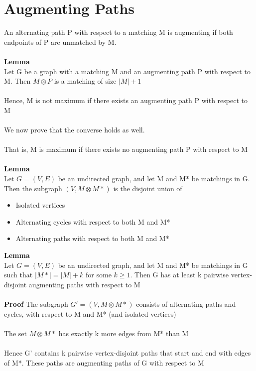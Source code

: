 \documentclass{article}[18pt]
\begin{document}
\section{Augmenting Paths} 
An alternating path P with respect to a matching M is augmenting if both endpoints of P are unmatched by M.\\
\\
\textbf{Lemma}\\
Let G be a graph with a matching M and an augmenting path P with respect to M. Then $M \otimes P$ is a matching of size $|M|+1$\\
\\
Hence, M is not maximum if there exists an augmenting path P with respect to M\\
\\
We now prove that the converse holds as well.\\
\\
That is, M is maximum if there exists no augmenting path P with respect to M\\
\\
\textbf{Lemma}\\
Let $G=(V,E)$ be an undirected graph, and let M and M* be matchings in G. Then the subgraph $(V, M\otimes M*)$ is the disjoint union of
\begin{itemize}
	\item Isolated vertices
	\item Alternating cycles with respect to both M and M*
	\item Alternating paths with respect to both M and M*
\end{itemize}
\textbf{Lemma}\\
Let $G=(V,E)$ be an undirected graph, and let M and M* be matchings in G such that $|M*|=|M|+k$ for some $k\geqslant 1$. Then G has at least k pairwise vertex-disjoint augmenting paths with respect to M\\
\\
\textbf{Proof}
The subgraph $G'=(V,M\otimes M*)$ consists of alternating paths and cycles, with respect to M and M* (and isolated vertices)\\
\\
The set $M\otimes M*$ has exactly k more edges from M* than M\\
\\
Hence G' contains k pairwise vertex-disjoint paths that start and end with edges of M*. These paths are augmenting paths of G with respect to M\\
\\
\end{document}
